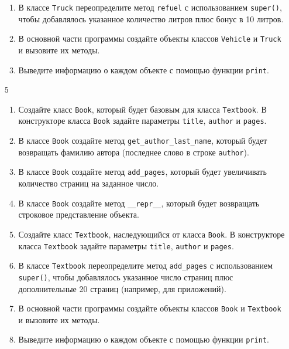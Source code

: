 \begin{enumerate}
\begin{enumerate}[leftmargin=*]
    \item В классе \texttt{Truck} переопределите метод \texttt{refuel} с использованием \texttt{super()}, чтобы добавлялось указанное количество литров плюс бонус в 10 литров.
    
    \item В основной части программы создайте объекты классов \texttt{Vehicle} и \texttt{Truck} и вызовите их методы.
    
    \item Выведите информацию о каждом объекте с помощью функции \texttt{print}.
\end{enumerate}

\item[5] 
\begin{enumerate}[leftmargin=*]
    \item Создайте класс \texttt{Book}, который будет базовым для класса \texttt{Textbook}. В конструкторе класса \texttt{Book} задайте параметры \texttt{title}, \texttt{author} и \texttt{pages}.
    
    \item В классе \texttt{Book} создайте метод \texttt{get\_author\_last\_name}, который будет возвращать фамилию автора (последнее слово в строке \texttt{author}).
    
    \item В классе \texttt{Book} создайте метод \texttt{add\_pages}, который будет увеличивать количество страниц на заданное число.
    
    \item В классе \texttt{Book} создайте метод \texttt{\_\_repr\_\_}, который будет возвращать строковое представление объекта.
    
    \item Создайте класс \texttt{Textbook}, наследующийся от класса \texttt{Book}. В конструкторе класса \texttt{Textbook} задайте параметры \texttt{title}, \texttt{author} и \texttt{pages}.
    
    \item В классе \texttt{Textbook} переопределите метод \texttt{add\_pages} с использованием \texttt{super()}, чтобы добавлялось указанное число страниц плюс дополнительные 20 страниц (например, для приложений).
    
    \item В основной части программы создайте объекты классов \texttt{Book} и \texttt{Textbook} и вызовите их методы.
    
    \item Выведите информацию о каждом объекте с помощью функции \texttt{print}.
\end{enumerate}


\end{enumerate}
